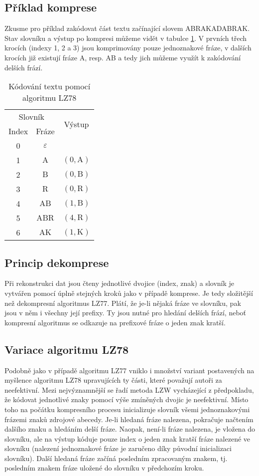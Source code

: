 \subsection{Příklad komprese}
Zkusme pro příklad zakódovat část textu začínající slovem ABRAKADABRAK. Stav slovníku a výstup po kompresi můžeme vidět v tabulce \ref{LZ78tabulka}. V prvních třech krocích (indexy 1, 2 a 3) jsou komprimovány pouze jednoznakové fráze, v dalších krocích již existují fráze A, resp. AB a tedy jich můžeme využít k zakódování delších frází.

\begin{table}[!htb]
\centering
\begin{tabular}{|c|c|c|}
\hline
\multicolumn{2}{|c|}{Slovník} & \multirow{2}{*}{Výstup}\\
Index & Fráze & \\
\hline
0 & $\varepsilon$ & \\
1 & $\mathrm{A}$ & $(0,\mathrm{A})$\\
2 & $\mathrm{B}$ & $(0,\mathrm{B})$\\
3 & $\mathrm{R}$ & $(0,\mathrm{R})$\\
4 & $\mathrm{AB}$ & $(1,\mathrm{B})$\\
5 & $\mathrm{ABR}$ & $(4,\mathrm{R})$\\
6 & $\mathrm{AK}$ & $(1,\mathrm{K})$\\
\hline
\end{tabular}
\caption{Kódování textu pomocí algoritmu LZ78}
\label{LZ78tabulka}
\end{table}

\subsection{Princip dekomprese}
Při rekonstrukci dat jsou čteny jednotlivé dvojice (index, znak) a slovník je vytvářen pomocí úplně stejných kroků jako v případě komprese. Je tedy složitější než dekompresní algoritmus LZ77. Plátí, že je-li nějaká fráze ve slovníku, pak jsou v něm i všechny její prefixy. Ty jsou nutné pro hledání delších frází, neboť kompresní algoritmus se odkazuje na prefixové fráze o jeden znak kratší.

\subsection{Variace algoritmu LZ78}
Podobně jako v případě algoritmu LZ77 vniklo i množství variant postavených na myšlence algoritmu LZ78 upravujících ty části, které považují autoři za neefektivní. Mezi nej\-vý\-zna\-mně\-jší se řadí metoda LZW vycházející z předpokladu, že kódovat jednotlivé znaky pomocí výše zmíněných dvojic je neefektivní. Místo toho na počátku kompresního procesu inicializuje slovník všemi jednoznakovými frázemi znaků zdrojové abecedy. Je-li hledaná fráze nalezena, pokračuje načtením dalšího znaku a hledáním delší fráze. Naopak, není-li fráze nalezena, je vložena do slovníku, ale na výstup kóduje pouze index o jeden znak kratší fráze nalezené ve slovníku (nalezení jednoznakové fráze je zaručeno díky původní inicializaci slovníku). Další hledaná fráze začíná posledním zpracovaným znakem, tj. posledním znakem fráze uložené do slovníku v předchozím kroku.
